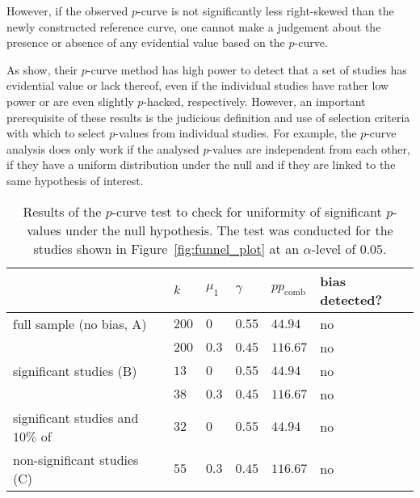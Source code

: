 However, if the observed $p$-curve is not significantly less right-skewed than the newly constructed reference curve, one cannot make a judgement about the presence or absence of any evidential value based on the $p$-curve.\par
As \citet{simonsohn_pcurve_detection_2014} show, their $p$-curve method has high power to detect that a set of studies has evidential value or lack thereof, even if the individual studies have rather low power or are even slightly $p$-hacked, respectively. However, an important prerequisite of these results is the judicious definition and use of selection criteria with which to select $p$-values from individual studies. For example, the $p$-curve analysis does only work if the analysed $p$-values are independent from each other, if they have a uniform distribution under the null and if they are linked to the same hypothesis of interest.\par
\begin{table}[h!]
  \begin{center}
    \begin{tabular}{ >{\raggedright\let\\\tabularnewline}p{} | >{\raggedleft\let\\\tabularnewline}p{}| >{\raggedleft\let\\\tabularnewline}p{} | >{\raggedleft\let\\\tabularnewline}p{} | >{\raggedleft\let\\\tabularnewline}p{} | >{\raggedright\let\\\tabularnewline}p{}} 
        \hline
         & $k$\TBstrut & $\mu_1$ & $\gamma$ & $pp_{\text{comb}}$ & bias detected?\\ 
        \hline
        full sample (no bias, A)\Tstrut & $200$ & $0$ & $0.55$ & $44.94$ & no \\ 
        & $200$\Bstrut & $0.3$ & $0.45$ & $116.67$ & no\\
        \hline
        significant studies (B)\Tstrut& $13$ & $0$ & $0.55$ & $44.94$ & no \\
        & $38$\Bstrut & $0.3$ & $0.45$ & $116.67$ & no \\
        \hline
        significant studies and $10\%$ of\Tstrut & $32$ & $0$ & $0.55$ & $44.94$ & no \\
        non-significant studies (C) & $55$\Bstrut & $0.3$ & $0.45$ & $116.67$ & no\\
     \hline
    \end{tabular}
    \caption[The $p$-curve test to check for uniformity of significant $p$-values under the null hypothesis.]{Results of the $p$-curve test to check for uniformity of significant $p$-values under the null hypothesis. The test was conducted for the studies shown in Figure~\ref{fig:funnel_plot} at an $\alpha$-level of $0.05$.}
    \label{tab:p_curve}
  \end{center}
\end{table}
